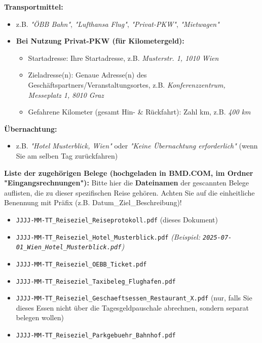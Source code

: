\documentclass[10pt]{article}
\begin{document}
\vspace{1em}

\textbf{Transportmittel:}
\begin{itemize}[nosep, leftmargin=1.5em, itemsep=0.2em]
    \item z.B. \textit{"ÖBB Bahn"}, \textit{"Lufthansa Flug"}, \textit{"Privat-PKW"}, \textit{"Mietwagen"}
    \item \textbf{Bei Nutzung Privat-PKW (für Kilometergeld):}
    \begin{itemize}[nosep, leftmargin=2em, itemsep=0.2em] %
        \item Startadresse: Ihre Startadresse, z.B. \textit{Musterstr. 1, 1010 Wien}
        \item Zieladresse(n): Genaue Adresse(n) des Geschäftspartners/Veranstaltungsortes, z.B. \textit{Konferenzzentrum, Messeplatz 1, 8010 Graz}
        \item Gefahrene Kilometer (gesamt Hin- \& Rückfahrt): Zahl km, z.B. \textit{400 km}
    \end{itemize}
\end{itemize}

\vspace{1em}

\textbf{Übernachtung:}
\begin{itemize}[nosep, leftmargin=1.5em, itemsep=0.2em]
    \item z.B. \textit{"Hotel Musterblick, Wien"} oder \textit{"Keine Übernachtung erforderlich"} (wenn Sie am selben Tag zurückfahren)
\end{itemize}

\vspace{1em}

\textbf{Liste der zugehörigen Belege (hochgeladen in BMD.COM, im Ordner "Eingangsrechnungen"):}
\small %
Bitte hier die \textbf{Dateinamen} der gescannten Belege auflisten, die zu dieser spezifischen Reise gehören. Achten Sie auf die einheitliche Benennung mit Präfix (z.B. Datum\_Ziel\_Beschreibung)!
\begin{itemize}[nosep, leftmargin=1.5em, itemsep=0.2em]
    \item \texttt{JJJJ-MM-TT\_Reiseziel\_Reiseprotokoll.pdf} (dieses Dokument)
    \item \texttt{JJJJ-MM-TT\_Reiseziel\_Hotel\_Musterblick.pdf} \textit{(Beispiel: \texttt{2025-07-01\_Wien\_Hotel\_Musterblick.pdf})}
    \item \texttt{JJJJ-MM-TT\_Reiseziel\_OEBB\_Ticket.pdf}
    \item \texttt{JJJJ-MM-TT\_Reiseziel\_Taxibeleg\_Flughafen.pdf}
    \item \texttt{JJJJ-MM-TT\_Reiseziel\_Geschaeftsessen\_Restaurant\_X.pdf} (nur, falls Sie dieses Essen nicht über die Tagesgeldpauschale abrechnen, sondern separat belegen wollen)
    \item \texttt{JJJJ-MM-TT\_Reiseziel\_Parkgebuehr\_Bahnhof.pdf}
\end{itemize}
\end{document}
